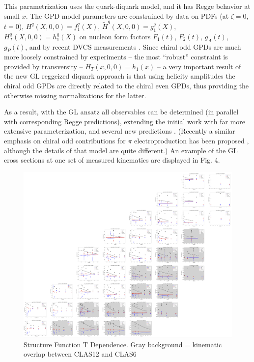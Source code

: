     This parametrization uses the quark-diquark model, and it has Regge behavior at small $x$. The GPD model parameters are constrained by data on PDFs (at $\zeta = 0$, $t = 0$), $H^q (X, 0, 0) = f^q_1 (X)$, $\tilde{H}^q (X, 0, 0) = g^q_1 (X)$, $H^q_T (X, 0, 0) = h^q_1 (X)$ on nucleon form factors $F_1(t)$, $F_2(t)$, $g_A(t)$, $g_P (t)$, and by recent DVCS measurements \cite{2} \cite{3}. Since chiral odd GPDs are much more loosely constrained by experiments – the most “robust” constraint is provided by transversity – $H_T (x, 0, 0) = h_1(x)$ – a very important result of the new GL reggeized diquark approach \cite{10} is that using helicity amplitudes the chiral odd GPDs are directly related to the chiral even GPDs, thus providing the otherwise missing normalizations for the latter.
    
    As a result, with the GL ansatz all observables can be determined (in parallel with corresponding Regge predictions), extending the initial work \cite{9} with far more extensive parameterization, and several new predictions \cite{11, 10}. (Recently a similar emphasis on chiral odd contributions for $\pi$ electroproduction has been proposed \cite{5}, although the details of that model are quite different.) An example of the GL cross sections at one set of measured kinematics are displayed in Fig. 4.
    \fi

    \begin{figure}[ht]
        \centering
        \includegraphics[trim={0 0 0 0},clip,angle=90,origin=c,width=\textwidth]{Chapters/Ch4-BaseAnalysis/bin_by_bin_cross_sections/t_dep_small_scale.png}
        \caption[T Dependence]{Structure Function T Dependence. Gray background = kinematic overlap between CLAS12 and CLAS6}
        \label{fig:t_dependence}
    \end{figure}

